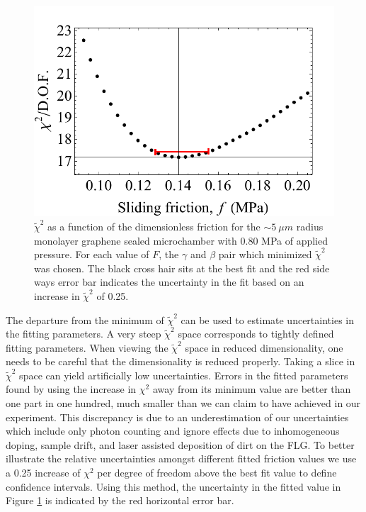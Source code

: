 \begin{figure}
	\begin{center}
	\includegraphics{Figs_Fit/2013-09-05_Fit_101psi_ErrorBar_ForThesis.pdf}
	\end{center}
	\caption[$\tilde{\chi}^2$ as a function of the dimensionless friction]{\label{fig:Fit:chispace}
	$\tilde{\chi}^2$ as a function of the dimensionless friction for the $\sim 5 \ \mu m$ radius monolayer graphene sealed microchamber with 0.80 MPa of applied pressure.
	For each value of $F$, the $\gamma$ and $\beta$ pair which minimized $\tilde{\chi}^2$ was chosen.
	The black cross hair sits at the best fit and the red side ways error bar indicates the uncertainty in the fit based on an increase in $\tilde{\chi}^2$ of 0.25.
	}
\end{figure}

The departure from the minimum of $\tilde{\chi}^2$ can be used to estimate uncertainties in the fitting parameters.
A very steep $\tilde{\chi}^2$ space corresponds to tightly defined fitting parameters.
When viewing the $\tilde{\chi}^2$ space in reduced dimensionality, one needs to be careful that the dimensionality is reduced properly.
Taking a slice in $\tilde{\chi}^2$ space can yield artificially low uncertainties.
Errors in the fitted parameters found by using the increase in $\chi^2$ away from its minimum value \cite{Press2007} are better than one part in one hundred, much smaller than we can claim to have achieved in our experiment.
This discrepancy is due to an underestimation of our uncertainties which include only photon counting and ignore effects due to inhomogeneous doping, sample drift, and laser assisted deposition of dirt on the FLG.
To better illustrate the relative uncertainties amongst different fitted friction values we use a 0.25 increase of $\chi^2$ per degree of freedom above the best fit value to define confidence intervals.
Using this method, the uncertainty in the fitted value in Figure \ref{fig:Fit:chispace} is indicated by the red horizontal error bar.